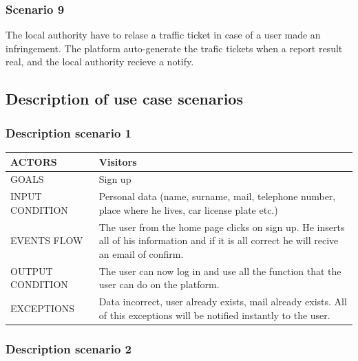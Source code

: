 \subsubsection{Scenario 9}
The local authority have to relase a traffic ticket in case of a user made an infringement. The platform auto-generate the trafic tickets when a report result real, and the local authority recieve a notify.

\subsection{Description of use case scenarios}
\subsubsection{Description scenario 1}


\begin{center}
	\begin{tabular}{ | l | p{6cm} | } 
		\hline
		ACTORS & Visitors  \\ 
		\hline
		GOALS & Sign up  \\ 
		\hline
		INPUT CONDITION & Personal data (name, surname, mail, telephone number, place where he lives, car license plate etc.)  \\ 
		\hline
		EVENTS FLOW & The user from the home page clicks on sign up. He inserts all of his information and if it is all correct he will recive an email of confirm.  \\ 
		\hline
		OUTPUT CONDITION & The user can now log in and use all the function that the user can do on the platform.  \\ 
		\hline
		EXCEPTIONS & Data incorrect, user already exists, mail already exists. All of this exceptions will be notified instantly to the user. \\ 
		\hline
	\end{tabular}
\end{center}

\subsubsection{Description scenario 2}

